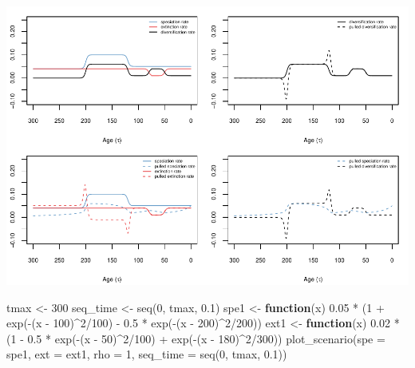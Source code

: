 \documentclass[
]{article}
\newenvironment{Shaded}{\begin{snugshade}}{\end{snugshade}}
\newcommand{\AttributeTok}[1]{\textcolor[rgb]{0.77,0.63,0.00}{#1}}
\newcommand{\ControlFlowTok}[1]{\textcolor[rgb]{0.13,0.29,0.53}{\textbf{#1}}}
\newcommand{\DecValTok}[1]{\textcolor[rgb]{0.00,0.00,0.81}{#1}}
\newcommand{\FloatTok}[1]{\textcolor[rgb]{0.00,0.00,0.81}{#1}}
\newcommand{\FunctionTok}[1]{\textcolor[rgb]{0.00,0.00,0.00}{#1}}
\newcommand{\NormalTok}[1]{#1}
\newcommand{\OtherTok}[1]{\textcolor[rgb]{0.56,0.35,0.01}{#1}}
\newcommand{\SpecialCharTok}[1]{\textcolor[rgb]{0.00,0.00,0.00}{#1}}
\begin{document}
\includegraphics{supplement_files/figure-latex/unnamed-chunk-14-1.pdf}

\pagebreak

\begin{Shaded}
\begin{Highlighting}[]
\NormalTok{tmax }\OtherTok{\textless{}{-}} \DecValTok{300}
\NormalTok{seq\_time }\OtherTok{\textless{}{-}} \FunctionTok{seq}\NormalTok{(}\DecValTok{0}\NormalTok{, tmax, }\FloatTok{0.1}\NormalTok{)}
\NormalTok{spe1 }\OtherTok{\textless{}{-}} \ControlFlowTok{function}\NormalTok{(x) }\FloatTok{0.05} \SpecialCharTok{*}\NormalTok{ (}\DecValTok{1} \SpecialCharTok{+} \FunctionTok{exp}\NormalTok{(}\SpecialCharTok{{-}}\NormalTok{(x }\SpecialCharTok{{-}} \DecValTok{100}\NormalTok{)}\SpecialCharTok{\^{}}\DecValTok{2}\SpecialCharTok{/}\DecValTok{100}\NormalTok{) }\SpecialCharTok{{-}} \FloatTok{0.5} \SpecialCharTok{*}
    \FunctionTok{exp}\NormalTok{(}\SpecialCharTok{{-}}\NormalTok{(x }\SpecialCharTok{{-}} \DecValTok{200}\NormalTok{)}\SpecialCharTok{\^{}}\DecValTok{2}\SpecialCharTok{/}\DecValTok{200}\NormalTok{))}
\NormalTok{ext1 }\OtherTok{\textless{}{-}} \ControlFlowTok{function}\NormalTok{(x) }\FloatTok{0.02} \SpecialCharTok{*}\NormalTok{ (}\DecValTok{1} \SpecialCharTok{{-}} \FloatTok{0.5} \SpecialCharTok{*} \FunctionTok{exp}\NormalTok{(}\SpecialCharTok{{-}}\NormalTok{(x }\SpecialCharTok{{-}} \DecValTok{50}\NormalTok{)}\SpecialCharTok{\^{}}\DecValTok{2}\SpecialCharTok{/}\DecValTok{100}\NormalTok{) }\SpecialCharTok{+}
    \FunctionTok{exp}\NormalTok{(}\SpecialCharTok{{-}}\NormalTok{(x }\SpecialCharTok{{-}} \DecValTok{180}\NormalTok{)}\SpecialCharTok{\^{}}\DecValTok{2}\SpecialCharTok{/}\DecValTok{300}\NormalTok{))}
\FunctionTok{plot\_scenario}\NormalTok{(}\AttributeTok{spe =}\NormalTok{ spe1, }\AttributeTok{ext =}\NormalTok{ ext1, }\AttributeTok{rho =} \DecValTok{1}\NormalTok{, }\AttributeTok{seq\_time =} \FunctionTok{seq}\NormalTok{(}\DecValTok{0}\NormalTok{,}
\NormalTok{    tmax, }\FloatTok{0.1}\NormalTok{))}
\end{Highlighting}
\end{Shaded}
\end{document}
